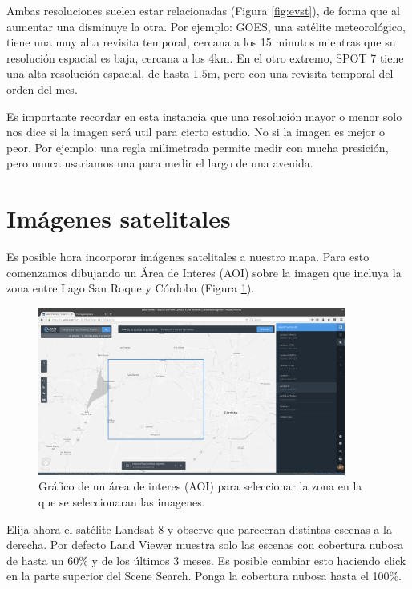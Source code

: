 \documentclass[a4paper,12pt]{book}
\begin{document}
Ambas resoluciones suelen estar relacionadas (Figura \ref{fig:evst}), de forma que al aumentar una disminuye la otra. Por ejemplo: GOES, una satélite meteorológico, tiene una muy alta revisita temporal, cercana a los 15 minutos mientras que su resolución espacial es baja, cercana a los 4km. En el otro extremo, SPOT 7 tiene una alta resolución espacial, de hasta $1.5$m, pero con una revisita temporal del orden del mes.

Es importante recordar en esta instancia que una resolución mayor o menor solo nos dice si la imagen será util para cierto estudio. No si la imagen es mejor o peor. Por ejemplo: una regla milimetrada permite medir con mucha presición, pero nunca usariamos una para medir el largo de una avenida.


\section{Imágenes satelitales}
Es posible hora incorporar imágenes satelitales a nuestro mapa. Para esto comenzamos dibujando un Área de Interes (AOI) sobre la imagen que incluya la zona entre Lago San Roque y Córdoba (Figura \ref{fig:aoi}).

\begin{figure}[h!]
    \centering
    \includegraphics[width=0.9\textwidth]{fig:aoi.png}
    \caption{Gráfico de un área de interes (AOI) para seleccionar la zona en la que se seleccionaran las imagenes.}
    \label{fig:aoi}
\end{figure}

Elija ahora el satélite Landsat 8 y observe que pareceran distintas escenas a la derecha. Por defecto Land Viewer muestra solo las escenas con cobertura nubosa de hasta un 60\% y de los últimos 3 meses. Es posible cambiar esto haciendo click en la parte superior del Scene Search.  Ponga la cobertura nubosa hasta el 100\%.
\end{document}

